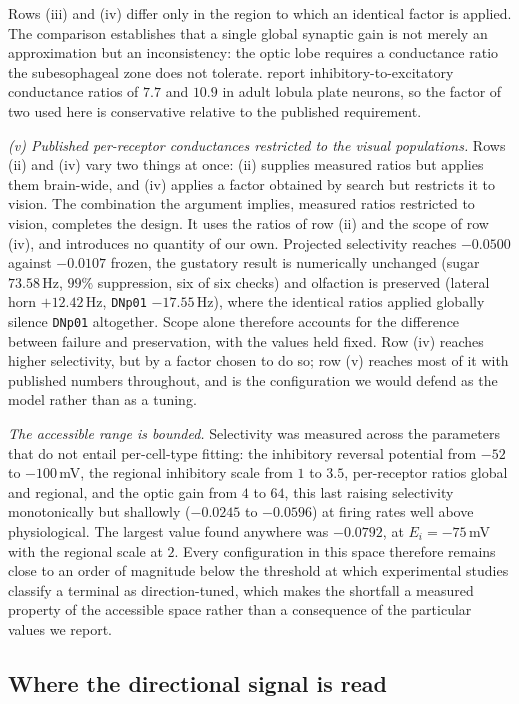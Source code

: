 \documentclass[10pt,twoside]{article}
\newcommand{\cell}[1]{\texttt{#1}}
\begin{document}
Rows (iii) and (iv) differ only in the region to which an identical factor is
applied. The comparison establishes that a single global synaptic gain is not
merely an approximation but an inconsistency: the optic lobe requires a
conductance ratio the subesophageal zone does not tolerate. \citet{groschner2022}
report inhibitory-to-excitatory conductance ratios of $7.7$ and $10.9$ in adult
lobula plate neurons, so the factor of two used here is conservative relative to
the published requirement.

\emph{(v) Published per-receptor conductances restricted to the visual
populations.} Rows (ii) and (iv) vary two things at once: (ii) supplies
measured ratios but applies them brain-wide, and (iv) applies a factor
obtained by search but restricts it to vision. The combination the argument
implies, measured ratios restricted to vision, completes the design. It uses
the ratios of row (ii) and the scope of row (iv), and introduces no quantity
of our own. Projected selectivity reaches $-0.0500$ against $-0.0107$
frozen, the gustatory result is numerically unchanged (sugar $73.58$\,Hz,
$99\%$ suppression, six of six checks) and olfaction is preserved (lateral
horn $+12.42$\,Hz, \cell{DNp01} $-17.55$\,Hz), where the identical ratios
applied globally silence \cell{DNp01} altogether. Scope alone therefore
accounts for the difference between failure and preservation, with the values
held fixed. Row (iv) reaches higher selectivity, but by a factor chosen to do
so; row (v) reaches most of it with published numbers throughout, and is the
configuration we would defend as the model rather than as a tuning.

\emph{The accessible range is bounded.} Selectivity was measured across the
parameters that do not entail per-cell-type fitting: the inhibitory reversal
potential from $-52$ to $-100$\,mV, the regional inhibitory scale from
$1$ to $3.5$, per-receptor ratios global and regional, and the optic gain
from $4$ to $64$, this last raising selectivity monotonically but shallowly
($-0.0245$ to $-0.0596$) at firing rates well above physiological. The
largest value found anywhere was $-0.0792$, at $E_i = -75$\,mV with the
regional scale at $2$. Every configuration in this space therefore remains
close to an order of magnitude below the threshold at which experimental
studies classify a terminal as direction-tuned, which makes the shortfall a
measured property of the accessible space rather than a consequence of the
particular values we report.

\subsection{Where the directional signal is read}
\label{sec:hs}
\end{document}
